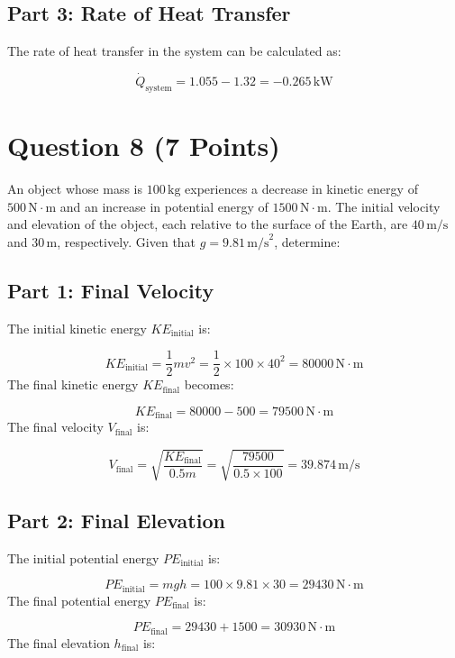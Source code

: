 \documentclass{article}
\begin{document}
\subsection*{Part 3: Rate of Heat Transfer}

The rate of heat transfer in the system can be calculated as:

\[
\dot{Q}_{\text{system}} = 1.055 - 1.32 = -\mathbf{0.265} \, \text{kW}
\]

\newpage
\section*{Question 8 (7 Points)}

An object whose mass is \(100 \, \text{kg}\) experiences a decrease in kinetic energy of \(500 \, \text{N} \cdot \text{m}\) and an increase in potential energy of \(1500 \, \text{N} \cdot \text{m}\). The initial velocity and elevation of the object, each relative to the surface of the Earth, are \(40 \, \text{m/s}\) and \(30 \, \text{m}\), respectively. Given that \(g = 9.81 \, \text{m/s}^2\), determine:

\subsection*{Part 1: Final Velocity}

The initial kinetic energy \(KE_{\text{initial}}\) is:

\[
KE_{\text{initial}} = \frac{1}{2} mv^2 = \frac{1}{2} \times 100 \times 40^2 = 80000 \, \text{N} \cdot \text{m}
\]
The final kinetic energy \(KE_{\text{final}}\) becomes:

\[
KE_{\text{final}} = 80000 - 500 = 79500 \, \text{N} \cdot \text{m}
\]
The final velocity \(V_{\text{final}}\) is:

\[
V_{\text{final}} = \sqrt{\frac{KE_{\text{final}}}{0.5m}} = \sqrt{\frac{79500}{0.5 \times 100}} = \mathbf{39.874} \, \text{m/s}
\]

\subsection*{Part 2: Final Elevation}

The initial potential energy \(PE_{\text{initial}}\) is:

\[
PE_{\text{initial}} = mgh = 100 \times 9.81 \times 30 = 29430 \, \text{N} \cdot \text{m}
\]
The final potential energy \(PE_{\text{final}}\) is:

\[
PE_{\text{final}} = 29430 + 1500 = 30930 \, \text{N} \cdot \text{m}
\]
The final elevation \(h_{\text{final}}\) is:
\end{document}
